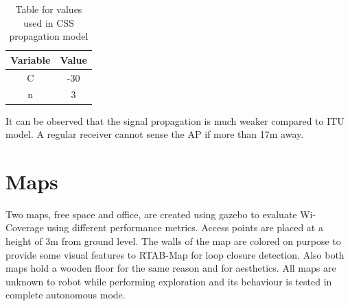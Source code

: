 \begin{table}[h!]
\centering
\begin{tabular}{c c}
\hline
Variable & Value\\
\hline
C        & -30\\
n        & 3\\
\hline
\end{tabular}
\caption{Table for values used in CSS propagation model}
\label{table:1}
\end{table}

It can be observed that the signal propagation is much weaker compared to ITU model. A regular receiver cannot sense the AP if more than 17m away.

\section{Maps}
Two maps, free space and office, are created using gazebo to evaluate Wi-Coverage using different performance metrics. Access points are placed at a height of 3m from ground level. The walls of the map are colored on purpose to provide some visual features to RTAB-Map for loop closure detection. Also both maps hold a wooden floor for the same reason and for aesthetics. All maps are unknown to robot while performing exploration and its behaviour is tested in complete autonomous mode.

